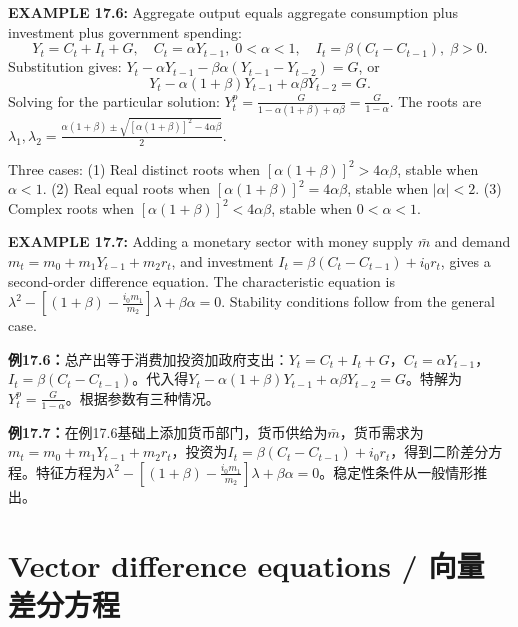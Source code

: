\begin{original}
\textbf{EXAMPLE 17.6:} Aggregate output equals aggregate consumption plus investment plus government spending:
\[
Y_t = C_t + I_t + G,\quad C_t = \alpha Y_{t-1},\; 0 < \alpha < 1,\quad I_t = \beta(C_t - C_{t-1}),\; \beta > 0.
\]
Substitution gives: $Y_t - \alpha Y_{t-1} - \beta\alpha(Y_{t-1} - Y_{t-2}) = G$, or
\[
Y_t - \alpha(1 + \beta)Y_{t-1} + \alpha\beta Y_{t-2} = G.
\]
Solving for the particular solution: $Y_t^p = \frac{G}{1 - \alpha(1 + \beta) + \alpha\beta} = \frac{G}{1-\alpha}$. The roots are $\lambda_1, \lambda_2 = \frac{\alpha(1+\beta) \pm \sqrt{[\alpha(1+\beta)]^2 - 4\alpha\beta}}{2}$.

Three cases: (1) Real distinct roots when $[\alpha(1+\beta)]^2 > 4\alpha\beta$, stable when $\alpha < 1$. (2) Real equal roots when $[\alpha(1+\beta)]^2 = 4\alpha\beta$, stable when $|\alpha| < 2$. (3) Complex roots when $[\alpha(1+\beta)]^2 < 4\alpha\beta$, stable when $0 < \alpha < 1$.

\textbf{EXAMPLE 17.7:} Adding a monetary sector with money supply $\bar{m}$ and demand $m_t = m_0 + m_1 Y_{t-1} + m_2 r_t$, and investment $I_t = \beta(C_t - C_{t-1}) + i_0 r_t$, gives a second-order difference equation. The characteristic equation is $\lambda^2 - \left[(1+\beta) - \frac{i_0 m_1}{m_2}\right]\lambda + \beta\alpha = 0$. Stability conditions follow from the general case.
\end{original}
\begin{translation}
\textbf{例17.6：}总产出等于消费加投资加政府支出：$Y_t = C_t + I_t + G$，$C_t = \alpha Y_{t-1}$，$I_t = \beta(C_t - C_{t-1})$。代入得$Y_t - \alpha(1 + \beta)Y_{t-1} + \alpha\beta Y_{t-2} = G$。特解为$Y_t^p = \frac{G}{1-\alpha}$。根据参数有三种情况。

\textbf{例17.7：}在例17.6基础上添加货币部门，货币供给为$\bar{m}$，货币需求为$m_t = m_0 + m_1 Y_{t-1} + m_2 r_t$，投资为$I_t = \beta(C_t - C_{t-1}) + i_0 r_t$，得到二阶差分方程。特征方程为$\lambda^2 - [(1+\beta) - \frac{i_0 m_1}{m_2}]\lambda + \beta\alpha = 0$。稳定性条件从一般情形推出。
\end{translation}

\section{Vector difference equations / 向量差分方程}

